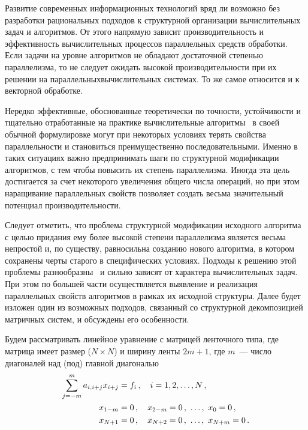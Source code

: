       \begin{multicols}{2}

      \label{st\stat}


     Развитие современных информационных технологий вряд ли возможно
без разработки рациональных подходов к структурной организации вычис\-ли\-тель\-ных 
задач и алгоритмов. От этого %
напрямую зависит производительность и 
эффективность вычислительных процессов параллельных средств 
обработки. Если задачи на уровне алгоритмов не обладают достаточной 
степенью параллелизма, то не следует ожидать высокой производительности при их 
решении на параллельных\linebreak вычислительных системах. То же самое относится и к 
векторной обработке.

     Нередко эффективные, обоснованные теоретически по точности,
устойчивости и тщательно отработанные на практике вычислительные
алгоритмы~\cite{1ol, 2ol} в своей обычной формулировке могут при
некоторых условиях терять свойства параллельности и становиться
преимущественно последовательными. Именно в таких ситуациях важно
предпринимать шаги по структурной модификации алгоритмов, с тем чтобы
повысить их степень параллелизма. Иногда эта цель достигается за счет
некоторого увеличения общего числа операций, но при этом наращивание
параллельных свойств позволяет создать весьма значительный потенциал
производительности.

     Следует отметить, что проблема структурной модификации исходного
алгоритма с целью придания ему более высокой степени параллелизма
является весьма непростой и, по существу, равносильна созданию нового
алгоритма, в котором сохранены черты старого в специфических условиях.
Подходы к решению этой проблемы разнообразны~\cite{3ol} и сильно зависят
от характера вычислительных задач. При этом по большей части
осуществляется выявление и реализация параллельных свойств алгоритмов в
рамках их исходной структуры. Далее будет изложен один из возможных
подходов, связанный со структурной декомпозицией матричных систем, и
обсуждены его особенности.

     Будем рассматривать линейное уравнение с мат\-ри\-цей ленточного типа,
где матрица имеет размер ($N\times N$) и ширину ленты $2m + 1$, где $m$~---
число диагоналей над (под) главной диагональю
     \begin{align}
     \sum\limits_{j=-m}^m a_{i,i+j}x_{i+j} & = f_i\,,\quad i=1, 2, \ldots , N\,,
     \label{e1ol}\\
     x_{1-m} & =0\,,\quad x_{2-m} =0\,,\ \ldots ,\  x_0 =0\,,\notag\\
     x_{N+1} & = 0\,, \quad x_{N+2} =0\,,\ \ldots ,\  x_{N+m}=0\,.\notag
     \end{align}


\end{multicols}
